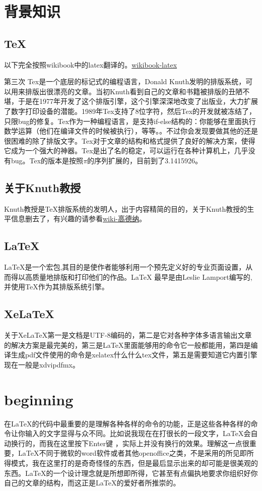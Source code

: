 \documentclass[11pt,oneside]{book}
\begin{document}
\chapter{背景知识}
\section{TeX}
以下完全按照wikibook中的latex翻译的。\href{http://en.wikibooks.org/wiki/LaTeX/Introduction}{wikibook-latex}

第三次 Tex是一个底层的标记式的编程语言，Donald Knuth发明的排版系统，可以用来排版出很漂亮的文章。当初Knuth看到自己的文章和书籍被排版的丑陋不堪，于是在1977年开发了这个排版引擎，这个引擎深深地改变了出版业，大力扩展了数字打印设备的潜能。1989年Tex支持了8位字符，然后Tex的开发就被冻结了，只限bug的修复。Tex作为一种编程语言，是支持if-else结构的：你能够在里面执行数学运算（他们在编译文件的时候被执行），等等。。不过你会发现要做其他的还是很困难的除了排版文字。Tex对于文章的结构和格式提供了良好的解决方案，使得它成为一个强大的神器。Tex是出了名的稳定，可以运行在各种计算机上，几乎没有bug。Tex的版本是按照$\pi$的序列扩展的，目前到了3.1415926。

\section{关于Knuth教授}
Knuth教授是\TeX 排版系统的发明人，出于内容精简的目的，关于Knuth教授的生平信息删去了，有兴趣的请参看\href{http://zh.wikipedia.org/wiki/%E9%AB%98%E5%BE%B7%E7%BA%B3}{wiki-高德纳}。

  \section{LaTeX}
  LaTeX是一个宏包,其目的是使作者能够利用一个预先定义好的专业页面设置，从而得以高质量地排版和打印他们的作品。LaTeX 最早是由Leslie Lamport编写的,并使用\TeX 作为其排版系统引擎\cite{lshort}。

  \section{XeLaTeX}
  关于XeLaTeX第一是文档是UTF-8编码的，第二是它对各种字体多语言输出文章的解决方案是最完美的，第三是LaTeX里面能够用的命令它一般都能用，第四是编译生成pdf文件使用的命令是xelatex什么什么tex文件，第五是需要知道它内置引擎现在一般是xdvipdfmx。


  \chapter{beginning}
  在\LaTeX 的代码中最重要的是理解各种各样的命令的功能，正是这些各种各样的命令让你输入的文字显得与众不同。比如说我现在在打很长的一段文字，\LaTeX 会自动换行的，而我在这里按下Enter键
  ，实际上并没有换行的效果。理解这一点很重要，\LaTeX 不同于微软的word软件或者其他openoffice之类，不是采用的所见即所得模式，我在这里打的是奇奇怪怪的东西，但是最后显示出来的却可能是很美观的东西。\LaTeX 的一个设计理念就是所想即所得，它甚至有点偏执地要求你组织好你自己的文章的结构，而这正是\LaTeX 的爱好者所推崇的。
\end{document}
